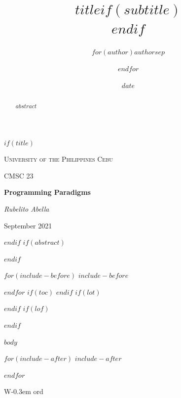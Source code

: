 \documentclass[$if(fontsize)$$fontsize$,$endif$$if(lang)$$lang$,$endif$$if(papersize)$$papersize$,$endif$$for(classoption)$$classoption$$sep$,$endfor$]{$documentclass$}
\title{$title$$if(subtitle)$\\\vspace{0.5em}{\large $subtitle$}$endif$}
\author{$for(author)$$author$$sep$ \and $endfor$}
\date{$date$}
\begin{document}
$if(title)$
\begin{titlepage}
	\centering
	{\scshape\LARGE University of the Philippines Cebu \par}
	\vspace{1cm}
	{\scshape\Large CMSC 23\par}
	\vspace{1.5cm}
	{\huge\bfseries Programming Paradigms\par}
	\vspace{2cm}
	{\Large\itshape Rubelito Abella\par}
	\vfill

	\vfill

	{\large September 2021\par}
\end{titlepage}
$endif$
$if(abstract)$
\begin{abstract}
$abstract$
\end{abstract}
$endif$

$for(include-before)$
$include-before$

$endfor$
$if(toc)$
{
\hypersetup{linkcolor=black}
\setcounter{tocdepth}{$toc-depth$}
\tableofcontents
}
$endif$
$if(lot)$
\listoftables
$endif$
$if(lof)$
\listoffigures
$endif$

$body$


\printbibliography

$for(include-after)$
$include-after$

$endfor$

W\kern-0.3em ord
\end{document}
